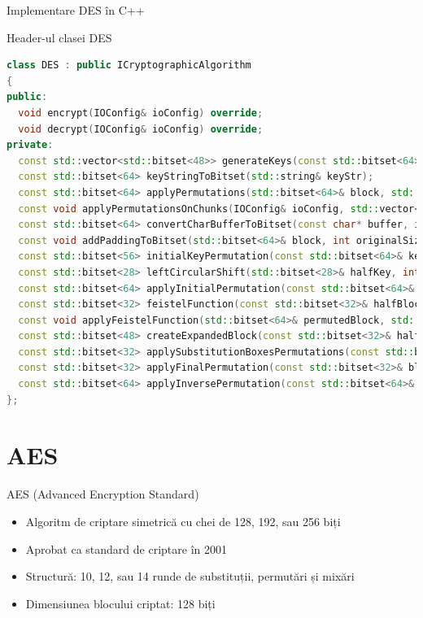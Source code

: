 \documentclass{beamer}
\begin{document}
\begin{frame}[fragile]{Implementare DES în C++}
  \begin{block}{Header-ul clasei DES}
    \begin{lstlisting}[language=C++]
class DES : public ICryptographicAlgorithm
{
public:
  void encrypt(IOConfig& ioConfig) override;
  void decrypt(IOConfig& ioConfig) override;
private:
  const std::vector<std::bitset<48>> generateKeys(const std::bitset<64>& key);
  const std::bitset<64> keyStringToBitset(std::string& keyStr);
  const std::bitset<64> applyPermutations(std::bitset<64>& block, std::vector<std::bitset<48>>& subKeys);
  const void applyPermutationsOnChunks(IOConfig& ioConfig, std::vector<std::bitset<48>>& subKeys);
  const std::bitset<64> convertCharBufferToBitset(const char* buffer, int bufferSize);
  const void addPaddingToBitset(std::bitset<64>& block, int originalSize);
  const std::bitset<56> initialKeyPermutation(const std::bitset<64>& key);
  const std::bitset<28> leftCircularShift(std::bitset<28>& halfKey, int shifts);
  const std::bitset<64> applyInitialPermutation(const std::bitset<64>& block);
  const std::bitset<32> feistelFunction(const std::bitset<32>& halfBlock, const std::bitset<48>& key);
  const void applyFeistelFunction(std::bitset<64>& permutedBlock, std::vector<std::bitset<48>>& subKeys);
  const std::bitset<48> createExpandedBlock(const std::bitset<32>& halfBlock);
  const std::bitset<32> applySubstitutionBoxesPermutations(const std::bitset<48>& xored);
  const std::bitset<32> applyFinalPermutation(const std::bitset<32>& block);
  const std::bitset<64> applyInversePermutation(const std::bitset<64>& permutedBlock);
};
    \end{lstlisting}
  \end{block}
\end{frame}

\section{AES}

\begin{frame}{AES (Advanced Encryption Standard)}
  \begin{itemize}
    \item Algoritm de criptare simetrică cu chei de 128, 192, sau 256 biți
    \item Aprobat ca standard de criptare în 2001
    \item Structură: 10, 12, sau 14 runde de substituții, permutări și mixări
    \item Dimensiunea blocului criptat: 128 biți
  \end{itemize}
\end{frame}
\end{document}
